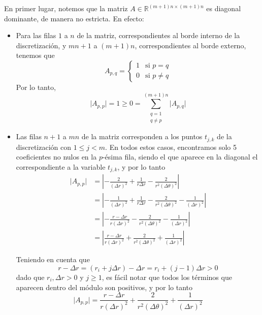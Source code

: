 \documentclass[11pt, a4paper, spanish]{article}
\theoremstyle{plain}
\theoremstyle{remark}
\begin{document}
      En primer lugar, notemos que la matriz $A \in \mathbb{R}^{(m+1)n \times (m+1)n}$ es diagonal dominante, de manera no estricta. En efecto:

      \begin{itemize}

        \item Para las filas $1$ a $n$ de la matriz, correspondientes al borde interno de la discretización, y $mn + 1 $ a $(m+1)n$, correspondientes al borde externo, tenemos que
          \[ A_{p,q} = \begin{cases}
            1 & \text{si $p = q$} \\
            0 & \text{si $p \neq q$}
          \end{cases} \]
        Por lo tanto,
          \[ \vert A_{p,p} \vert = 1 \geq 0 = \sum_{\substack{q=1 \\ q \neq p}}^{(m+1)n} \vert A_{p,q} \vert \]

        \item Las filas $n + 1$ a $mn$ de la matriz corresponden a los puntos $t_{j,k}$ de la discretización con $1 \leq j < m$. En todos estos casos, encontramos solo 5 coeficientes no nulos en la $p$-ésima fila, siendo el que aparece en la diagonal el correspondiente a la variable $t_{j,k}$, y por lo tanto
          \[ \begin{split}
            \vert A_{p,p} \vert &= \left \vert - \frac{2}{(\Delta r)^2} + \frac{1}{r \Delta r} - \frac{2}{r^2 (\Delta \theta)^2} \right \vert \\
            &= \left \vert - \frac{1}{(\Delta r)^2} + \frac{1}{r \Delta r} - \frac{2}{r^2 (\Delta \theta)^2} - \frac{1}{(\Delta r)^2} \right \vert \\
            &= \left \vert - \frac{r - \Delta r}{r (\Delta r)^2} - \frac{2}{r^2 (\Delta \theta)^2} - \frac{1}{(\Delta r)^2} \right \vert \\
            &= \left \vert \frac{r - \Delta r}{r (\Delta r)^2} + \frac{2}{r^2 (\Delta \theta)^2} + \frac{1}{(\Delta r)^2} \right \vert
          \end{split} \]

        Teniendo en cuenta que
          \[ r - \Delta r = (r_i + j \Delta r) - \Delta r = r_i + (j - 1) \Delta r > 0\]
        dado que $r_i, \Delta r > 0$ y $j \geq 1$, es fácil notar que todos los términos que aparecen dentro del módulo son positivos, y por lo tanto
          \[ \vert A_{p,p} \vert = \frac{r - \Delta r}{r (\Delta r)^2} + \frac{2}{r^2 (\Delta \theta)^2} + \frac{1}{(\Delta r)^2} \]


\end{itemize}
\end{document}
